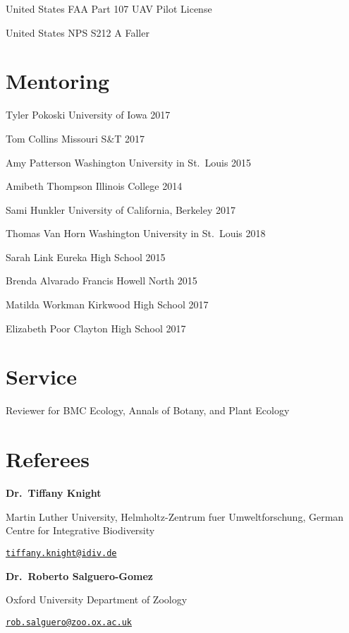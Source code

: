 \documentclass[11pt,]{article}
\begin{document}
United States FAA Part 107 UAV Pilot License

United States NPS S212 A Faller

\hypertarget{mentoring}{%
\section{Mentoring}\label{mentoring}}

Tyler Pokoski \hfill  University of Iowa 2017

Tom Collins \hfill Missouri S\&T 2017

Amy Patterson \hfill Washington University in St.~Louis 2015

Amibeth Thompson \hfill Illinois College 2014

Sami Hunkler \hfill University of California, Berkeley 2017

Thomas Van Horn \hfill Washington University in St.~Louis 2018

Sarah Link \hfill Eureka High School 2015

Brenda Alvarado \hfill Francis Howell North 2015

Matilda Workman \hfill Kirkwood High School 2017

Elizabeth Poor \hfill Clayton High School 2017

\hypertarget{service}{%
\section{Service}\label{service}}

Reviewer for BMC Ecology, Annals of Botany, and Plant Ecology

\hypertarget{referees}{%
\section{Referees}\label{referees}}

\textbf{Dr.~Tiffany Knight}

Martin Luther University, Helmholtz-Zentrum fuer Umweltforschung, German
Centre for Integrative Biodiversity

\href{mailto:tiffany.knight@idiv.de}{\nolinkurl{tiffany.knight@idiv.de}}

\textbf{Dr.~Roberto Salguero-Gomez}

Oxford University Department of Zoology

\href{mailto:rob.salguero@zoo.ox.ac.uk}{\nolinkurl{rob.salguero@zoo.ox.ac.uk}}
\end{document}

